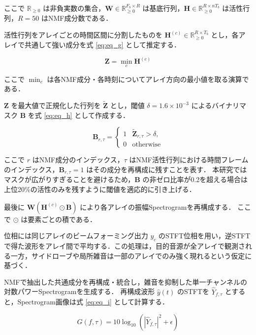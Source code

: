 \documentclass{article}
\begin{document}
	ここで $\mathbb{R}_{\ge0}$ は非負実数の集合，$\mathbf{W}\in\mathbb{R}_{\ge0}^{F_b\times R}$ は基底行列，$\mathbf{H}\in\mathbb{R}_{\ge0}^{R\times nT_b}$ は活性行列，$R=50$ はNMF成分数である．

	活性行列をアレイごとの時間区間に分割したものを $\mathbf{H}^{(c)}\in\mathbb{R}_{\ge0}^{R\times T_b}$ とし，各アレイで共通して強い成分を式 \ref{eq:eq_g} として推定する．

	\begin{equation}
	\label{eq:eq_g}
	\mathbf{Z}=\min_{c}\mathbf{H}^{(c)}
	\end{equation}
	
	ここで $\min_c$ は各NMF成分・各時刻についてアレイ方向の最小値を取る演算である．

	$\mathbf{Z}$ を最大値で正規化した行列を $\tilde{\mathbf{Z}}$ とし，閾値 $\delta=1.6\times10^{-3}$ によるバイナリマスク $\mathbf{B}$ を式 \ref{eq:eq_h} として作成する．

	\begin{equation}
	\label{eq:eq_h}
	\mathbf{B}_{r,\tau}=
	\begin{cases}
	1 & \tilde{\mathbf{Z}}_{r,\tau}>\delta,\\
	0 & \mathrm{otherwise}
	\end{cases}
	\end{equation}
	
	ここで $r$ はNMF成分のインデックス，$\tau$ はNMF活性行列における時間フレームのインデックス，$\mathbf{B}_{r,\tau}=1$ はその成分を再構成に残すことを表す．
	本研究ではマスクが広がりすぎることを避けるため，$\mathbf{B}$ の非ゼロ比率が0.2を超える場合は上位20\%の活性のみを残すように閾値を適応的に引き上げる．

	最後に $\mathbf{W}(\mathbf{H}^{(c)}\odot\mathbf{B})$ により各アレイの振幅Spectrogramを再構成する．
	ここで $\odot$ は要素ごとの積である．

	位相には同じアレイのビームフォーミング出力 $y_c$ のSTFT位相を用い，逆STFTで得た波形をアレイ間で平均する．この処理は，目的音源が全アレイで観測される一方，サイドローブや局所雑音は一部のアレイでのみ強く現れるという仮定に基づく．

	NMFで抽出した共通成分を再構成・統合し，雑音を抑制した単一チャンネルの対数パワーSpectrogramを生成する．
	再構成波形 $\hat{y}(t)$ のSTFTを $\hat{Y}_{f,\tau}$ とすると，Spectrogram画像は式 \ref{eq:eq_i} として計算する．

	\begin{equation}
	\label{eq:eq_i}
	G(f,\tau)=10\log_{10}\left(|\hat{Y}_{f,\tau}|^2+\epsilon\right)
	\end{equation}
	
\end{document}
